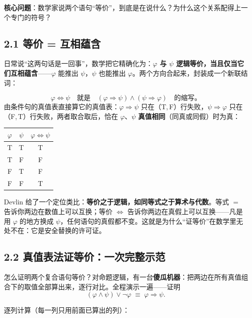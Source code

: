 \documentclass[UTF8,a4paper,11pt]{ctexart}
\begin{document}
\textbf{核心问题}：数学家说两个语句“等价”，到底是在说什么？为什么这个关系配得上一个专门的符号？

\subsection*{2.1 等价 = 互相蕴含}

日常说“这两句话是一回事”，数学把它精确化为：\textbf{$\varphi$ 与 $\psi$ 逻辑等价，当且仅当它们互相蕴含}——$\varphi$ 能推出 $\psi$，$\psi$ 也能推出 $\varphi$。两个方向合起来，封装成一个新联结词：

\begin{keyconcept}
\[
\varphi \Leftrightarrow \psi \quad\text{就是}\quad (\varphi \Rightarrow \psi) \land (\psi \Rightarrow \varphi) \quad\text{的缩写。}
\]
由条件句的真值表直接算它的真值表：$\varphi \Rightarrow \psi$ 只在（T,\,F）行失败，$\psi \Rightarrow \varphi$ 只在（F,\,T）行失败，两者取合取后，恰在 $\varphi$、$\psi$ \textbf{真值相同}（同真或同假）时为真：
\begin{center}
\begin{tabular}{cc|c}
\toprule
$\varphi$ & $\psi$ & $\varphi \Leftrightarrow \psi$ \\
\midrule
T & T & T \\
T & F & F \\
F & T & F \\
F & F & T \\
\bottomrule
\end{tabular}
\end{center}
\end{keyconcept}

Devlin 给了一个定位类比：\textbf{等价之于逻辑，如同等式之于算术与代数}。等式 $=$ 告诉你两边在数值上可以互换；等价 $\Leftrightarrow$ 告诉你两边在真假上可以互换——凡是用 $\varphi$ 的地方换成 $\psi$，任何语句的真假都不变。这就是为什么“证等价”在数学里无处不在：它是安全替换的许可证。

\subsection*{2.2 真值表法证等价：一次完整示范}

怎么证明两个复合语句等价？对命题逻辑，有一台\textbf{傻瓜机器}：把两边在所有真值组合下的取值全部算出来，逐行对比。全程演示一遍——证明
\[
(\varphi \land \psi) \lor \neg \varphi \;\equiv\; \varphi \Rightarrow \psi .
\]

逐列计算（每一列只用前面已算出的列）：
\end{document}
